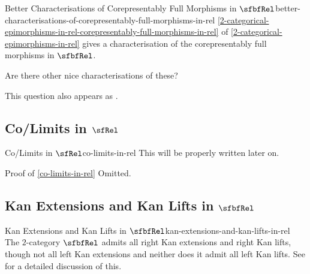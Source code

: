 \begin{question}{Better Characterisations of Corepresentably Full Morphisms in $\sfbfRel$}{better-characterisations-of-corepresentably-full-morphisms-in-rel}%
    \cref{2-categorical-epimorphisms-in-rel-corepresentably-full-morphisms-in-rel} of \cref{2-categorical-epimorphisms-in-rel} gives a characterisation of the corepresentably full morphisms in $\sfbfRel$.

    Are there other nice characterisations of these?

    This question also appears as \cite{MO467527}.
\end{question}
\subsection{Co/Limits in $\sfRel$}\label{subsection-co-limits-in-rel}
\begin{proposition}{Co/Limits in $\sfRel$}{co-limits-in-rel}%
    This will be properly written later on.
\end{proposition}
\begin{Proof}{Proof of \cref{co-limits-in-rel}}%
    Omitted.
\end{Proof}
\subsection{Kan Extensions and Kan Lifts in $\sfbfRel$}\label{subsection-kan-extensions-and-kan-lifts-in-rel}
\begin{remark}{Kan Extensions and Kan Lifts in $\sfbfRel$}{kan-extensions-and-kan-lifts-in-rel}%
    The $2$-category $\sfbfRel$ admits all right Kan extensions and right Kan lifts, though not all left Kan extensions and neither does it admit all left Kan lifts. See  for a detailed discussion of this.
\end{remark}

